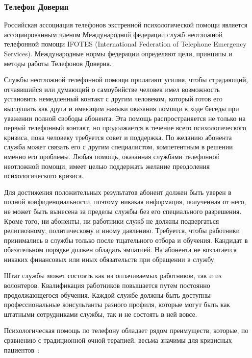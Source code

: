 \subsubsection{Телефон Доверия}

Российская ассоциация телефонов экстренной психологической помощи является ассоциированным членом Международной федерации служб неотложной телефонной помощи IFOTES (International Federation of Telephone Emergency Services). Международные нормы федерации определяют цели, принципы и методы работы Телефонов Доверия.~\cite{starsen}

Службы неотложной телефонной помощи прилагают усилия, чтобы страдающий, отчаявшийся или думающий о самоубийстве человек имел возможность установить немедленный контакт с другим человеком, который готов его выслушать как друга и имеющим навыки оказания помощи в ходе беседы при уважении полной свободы абонента. Эта помощь распространяется не только на первый телефонный контакт, но продолжается в течение всего психологического кризиса, пока человеку требуется совет и поддержка. По желанию абонента служба может связать его с другим специалистом, компетентным в решении именно его проблемы. Любая помощь, оказанная службами телефонной неотложной помощи, имеет целью поддержать желание преодоления психологического кризиса.~\cite{starsen}

Для достижения положительных результатов абонент должен быть уверен в полной конфиденциальности, поэтому никакая информация, полученная от него, не может быть вынесена за пределы службы без его специального разрешения. Кроме того, ни абоненты, ни работники служб не должны подвергаться религиозному, политическому и иному давлению. Требуется, чтобы работники принимались в службы только после тщательного отбора и обучения. Кандидат в обязательном порядке должен обладать эмпатией. На абонента не возлагается никаких финансовых или иных обязательств при обращении в службу.~\cite{starsen}

Штат службы может состоять как из оплачиваемых работников, так и из волонтеров. Квалификация работников повышается путем постоянно продолжающегося обучения. Каждой службе должны быть доступны профессиональные консультанты разного профиля, которые могут быть как штатными сотрудниками службы, так и не состоять в ней вовсе.~\cite{starsen}

Психологическая помощь по телефону обладает рядом преимуществ, которые, по сравнению с традиционной очной терапией, весьма значимы для кризисных пациентов~\cite{starsen}:

